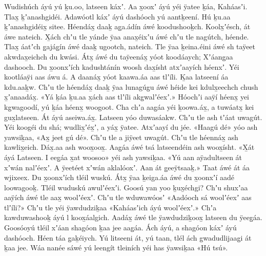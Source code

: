\clearpage
\begin{pairs}
\begin{Leftside}
\beginnumbering
\pstart
{}Wudishúch áyú yú ḵu.oo, latseen káxʼ.
Aa x̱ooxʼ áyú yéi ÿatee ḵáa, Kaháasʼi.
Tlax̱ ḵʼanashgi\-déi.
Adawóotl káxʼ áyú dashóoch yú aantḵeení.
Hú ḵu.aa ḵʼanashgidéix̱ sitee.
Héendáx̱ daaḵ ag̱a.ádín áwé koodushooḵch.
Koolx̱ʼésch, át áwe nateich.
X̱ách chʼu tle yánde ÿaa anax̱éixʼu áwé chʼu tle nagútch, héende.
Tlax̱ áatʼch g̱ajág̱ín áwé daaḵ ugootch, nateich.
Tle ÿaa ḵeina.éini áwé sh taÿeet akwdax̱eichch du kwási.
Átx̱ áwé du taÿeenáx̱ yóot koodáaych;
Xʼáang̱aa dashooch.
Du x̱oonxʼích kadushtánín woosh dax̱ísht atxʼaayích héenxʼ.
Yéi kootláaÿi aas áwu á.
A daanáx̱ yóot kaawa.áa aas tlʼíli.
Ḵaa latseení áa kdu.aaḵw.
Chʼu tle héendáx̱ daaḵ ÿaa lunagúg̱u áwé héide kei kdulx̱eechch chush x̱ʼanaadáx̱.
«\!Yá ḵáa ḵu.aa x̱ách aas tlʼíli akg̱wa\-lʼéexʼ.\!»
\pend
\pstart
{}Hóochʼi aaÿí héenx̱ yei kg̱wagoodí, yú ḵáa héenx̱ woogoot.
Cha chʼa aag̱áa yéi ḵoowa.áx̱, a tuwáatx̱ kei gux̱la\-tseen.
Át áyú aseiwa.áx̱.
Latseen yóo duwasáakw.
Chʼu tle ash tʼáat uwagút.
Yéi koogéi du shá;
wudlix̱ʼéx̱ʼ, a yáx̱ ÿatee.
Atxʼaayí du jée.
«\!Haagú dé\!» yóo ash yawsiḵaa,
«\!Ax̱ jeet gú dé\!».
Chʼu tle a jiÿeet uwagút.
Chʼu tle héennáx̱ ash kawlix̱eich.
Dáx̱.aa ash woox̱oox̱.
Aag̱áa áwé tsá latseendéin ash woox̱ísht.
«\!X̱át áyá Latseen.
I eeg̱áa x̱at woosoo\!» yéi ash yawsiḵaa.
«\!Yú aan aÿadultseen át xʼwán nalʼéexʼ.
A ÿeetéet xʼwán aklalóoxʼ.
Aan át g̱eeÿtsaaḵ.\!»
\pend
\pstart
{}Taat áwé át áa wjixeex.
Du x̱oonxʼích tléil wuskú.
Átx̱ ÿaa ḵeiga.áa áwé du x̱oonxʼí aadé loowagooḵ.
Tléil wuduskú awulʼéexʼi.
Goosú yan yoo ḵux̱échgi?
Chʼu shuxʼaa aaÿích áwé tle aax̱ woolʼéexʼ.
Chʼu tle wduwawóosʼ
«\!Aadóo\-ch sá woolʼéexʼ aas tlʼíli?\!»
Chʼu tle yéi ÿaw\-du\-dzi\-ḵaa
«\!Kaháasʼich áyú woolʼéexʼ.\!»
Chʼa kawduwashooḵ áyú l koox̱áalgich.
Aadáx̱ áwé tle ÿawdudziḵoox̱ latseen du ÿeeg̱áa.
Goosóoyú tléil xʼáan shagóon ḵaa jee aag̱áa.
Ách áyú, a shagóon káxʼ áyú dashóoch.
Héen táa g̱aḵéiych.
Yú litseeni át, yú taan, tlél ách g̱wadudlijaag̱i át ḵaa jee.
Wáa nanée sáwé yú leengít tleiních yéi has ÿawsiḵaa «\!Hú tsú\!».

\end{Leftside}
\end{pairs}
